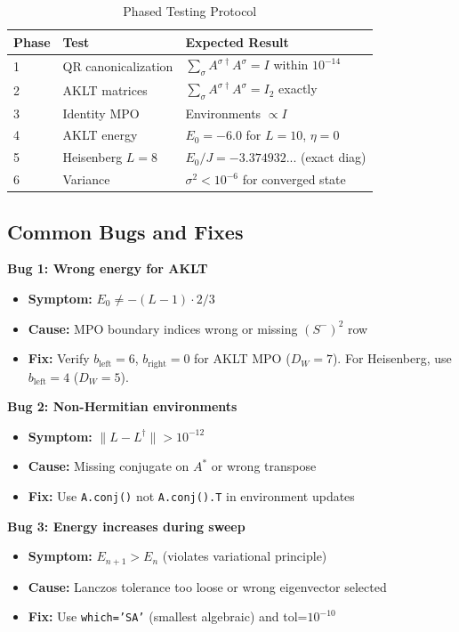 \documentclass[aps,prb,onecolumn,scriptaddress]{revtex4-2}
\begin{document}
	\begin{table}[h]
		\centering
		\caption{Phased Testing Protocol}
		\begin{tabular}{@{}llp{6cm}@{}}
			\toprule
			\textbf{Phase} & \textbf{Test} & \textbf{Expected Result} \\
			\midrule
			1 & QR canonicalization & $\sum_\sigma A^{\sigma\dagger} A^\sigma = I$ within $10^{-14}$ \\
			2 & AKLT matrices & $\sum_\sigma A^{\sigma\dagger} A^\sigma = I_2$ exactly \\
			3 & Identity MPO & Environments $\propto I$ \\
			4 & AKLT energy & $E_0 = -6.0$ for $L=10$, $\eta = 0$ \\
			5 & Heisenberg $L=8$ & $E_0 / J = -3.374932...$ (exact diag) \\
			6 & Variance & $\sigma^2 < 10^{-6}$ for converged state \\
			\bottomrule
		\end{tabular}
	\end{table}
	
	\subsection{Common Bugs and Fixes}
	
	\textbf{Bug 1: Wrong energy for AKLT}
	\begin{itemize}
		\item \textbf{Symptom:} $E_0 \neq -(L-1) \cdot 2/3$
		\item \textbf{Cause:} MPO boundary indices wrong or missing $(S^-)^2$ row
		\item \textbf{Fix:} Verify $b_{\text{left}} = 6$, $b_{\text{right}} = 0$ for AKLT MPO ($D_W=7$). For Heisenberg, use $b_{\text{left}} = 4$ ($D_W=5$).
	\end{itemize}
	
	\textbf{Bug 2: Non-Hermitian environments}
	\begin{itemize}
		\item \textbf{Symptom:} $\|L - L^\dagger\| > 10^{-12}$
		\item \textbf{Cause:} Missing conjugate on $A^*$ or wrong transpose
		\item \textbf{Fix:} Use \texttt{A.conj()} not \texttt{A.conj().T} in environment updates
	\end{itemize}
	
	\textbf{Bug 3: Energy increases during sweep}
	\begin{itemize}
		\item \textbf{Symptom:} $E_{n+1} > E_n$ (violates variational principle)
		\item \textbf{Cause:} Lanczos tolerance too loose or wrong eigenvector selected
		\item \textbf{Fix:} Use \texttt{which='SA'} (smallest algebraic) and tol=$10^{-10}$
	\end{itemize}
	
\end{document}
